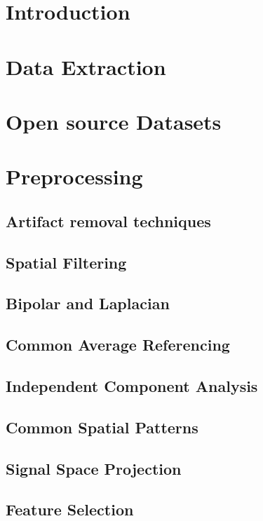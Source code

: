 \section*{Introduction}

\section{Data Extraction}

\section{Open source Datasets}

\section{Preprocessing}

\subsection{Artifact removal techniques}

\subsection{Spatial Filtering}

\subsection{Bipolar and Laplacian}

\subsection{Common Average Referencing}

\subsection{Independent Component Analysis}

\subsection{Common Spatial Patterns}

\subsection{Signal Space Projection}

\subsection{Feature Selection}

